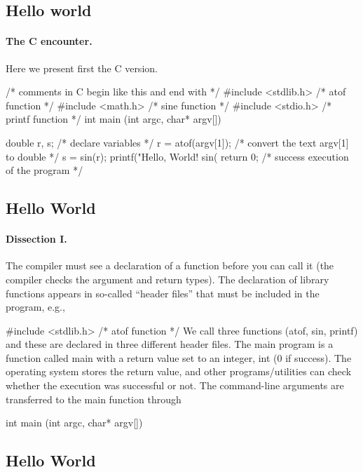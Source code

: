 \documentclass[%
oneside,                 %
final,                   %
10pt]{article}
\begin{document}
\subsection{Hello world}


\paragraph{The C encounter.}
Here we present first the C version.

\bcppcod
/* comments in C begin like this and end with */
#include <stdlib.h> /* atof function */
#include <math.h>   /* sine function */
#include <stdio.h>  /* printf function */
int main (int argc, char* argv[])
{
  double r, s;        /* declare variables */
  r = atof(argv[1]);  /* convert the text argv[1] to double */
  s = sin(r);
  printf("Hello, World! sin(%
  return 0;           /* success execution of the program */

\ecppcod



\subsection{Hello World}


\paragraph{Dissection I.}
The compiler must see a declaration of a function before you can
call it (the compiler checks the argument and return types).
The declaration of library functions appears
in so-called ``header files'' that must be included in the program, e.g.,

\bcppcod
   #include <stdlib.h> /* atof function */
\ecppcod
We call three functions (atof, sin, printf)
and these are declared in three different header files.
The main program is a function called main
with a return value set to an integer, int (0 if success).
The operating system stores the return value,
and other programs/utilities can check whether
the execution was successful or not.
The command-line arguments are transferred to the main function through

\bcppcod
   int main (int argc, char* argv[])
\ecppcod



\subsection{Hello World}


}
\end{document}
